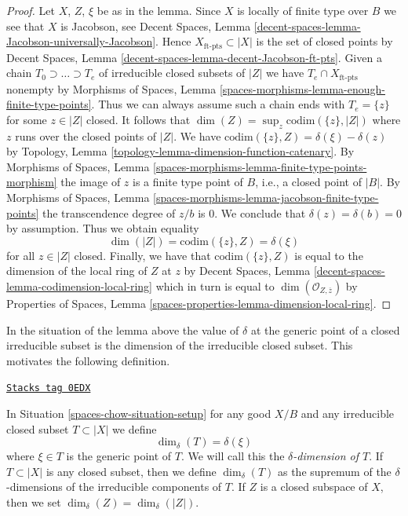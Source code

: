 \begin{proof}
Let $X$, $Z$, $\xi$ be as in the lemma.
Since $X$ is locally of finite type over $B$ we see that $X$ is Jacobson, see
Decent Spaces, Lemma
\ref{decent-spaces-lemma-Jacobson-universally-Jacobson}.
Hence $X_{\text{ft-pts}} \subset |X|$ is the set of closed points
by Decent Spaces, Lemma \ref{decent-spaces-lemma-decent-Jacobson-ft-pts}.
Given a chain $T_0 \supset \ldots \supset T_e$
of irreducible closed subsets of $|Z|$ we have
$T_e \cap X_{\text{ft-pts}}$ nonempty by
Morphisms of Spaces, Lemma
\ref{spaces-morphisms-lemma-enough-finite-type-points}.
Thus we can always assume such a chain ends
with $T_e = \{z\}$ for some $z \in |Z|$ closed.
It follows that $\dim(Z) = \sup_z \text{codim}(\{z\}, |Z|)$
where $z$ runs over the closed points of $|Z|$.
We have $\text{codim}(\{z\}, Z) = \delta(\xi) - \delta(z)$
by Topology, Lemma \ref{topology-lemma-dimension-function-catenary}.
By Morphisms of Spaces, Lemma
\ref{spaces-morphisms-lemma-finite-type-points-morphism}
the image of $z$ is a finite type point of $B$, i.e.,
a closed point of $|B|$. By
Morphisms of Spaces, Lemma
\ref{spaces-morphisms-lemma-jacobson-finite-type-points}
the transcendence degree of $z/b$ is $0$.
We conclude that $\delta(z) = \delta(b) = 0$ by assumption.
Thus we obtain equality
$$
\dim(|Z|) = \text{codim}(\{z\}, Z) = \delta(\xi)
$$
for all $z \in |Z|$ closed. Finally, we have that
$\text{codim}(\{z\}, Z)$ is equal to the dimension of the
local ring of $Z$ at $z$ by
Decent Spaces, Lemma \ref{decent-spaces-lemma-codimension-local-ring}
which in turn is equal to
$\dim(\mathcal{O}_{Z, \overline{z}})$ by
Properties of Spaces, Lemma \ref{spaces-properties-lemma-dimension-local-ring}.
\end{proof}

In the situation of the lemma above the value of $\delta$
at the generic point of a closed irreducible subset
is the dimension of the irreducible closed subset.
This motivates the following definition.

\begin{definition}
\label{spaces-chow-definition-delta-dimension}
\href{https://stacks.math.columbia.edu/tag/0EDX}{\texttt{Stacks tag 0EDX}}

In Situation \ref{spaces-chow-situation-setup} for any good $X/B$
and any irreducible closed subset $T \subset |X|$ we define
$$
\dim_\delta(T) = \delta(\xi)
$$
where $\xi \in T$ is the generic point of $T$.
We will call this the {\it $\delta$-dimension of $T$}.
If $T \subset |X|$ is any closed subset, then we define
$\dim_\delta(T)$ as the supremum of the $\delta$-dimensions
of the irreducible components of $T$.
If $Z$ is a closed subspace of $X$, then we set
$\dim_\delta(Z) = \dim_\delta(|Z|)$.
\end{definition}

